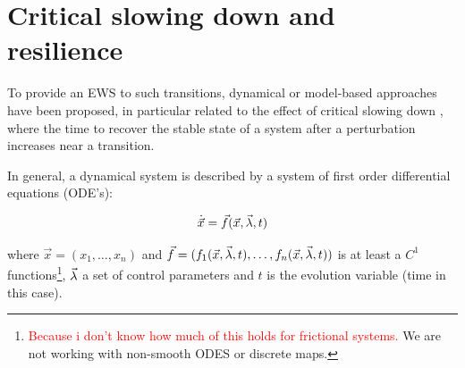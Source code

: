 










\section{Critical slowing down and resilience}


To provide an EWS to such transitions, dynamical or model-based approaches have been proposed, in particular related to the effect of critical slowing down \citep{Scheffer2009,Scheffer344,doi:10.1111/j.1600-0706.2012.20838.x}, where the time to recover the stable state of a system after a perturbation increases near a transition.





In general, a dynamical system is described by a system of first order differential equations (ODE's):

\begin{equation}
\dot{\vec x}=\vec f(\vec x,\vec{\lambda},t)
\label{eq: ODES}
\end{equation}

where $\vec x=(x_1,\dots,x_n)$ and $\vec f=(f_1(\vec x,\vec {\lambda} ,t),\dots,f_n(\vec x,\vec {\lambda} ,t))$ is at least a $C^1$  functions\footnote{\textcolor{red}{Because i don't know how much of this holds for frictional systems. }We are not working with non-smooth ODES or discrete maps.}, $\vec{\lambda}$ a set of control parameters and $t$ is the evolution variable (time in this case).


